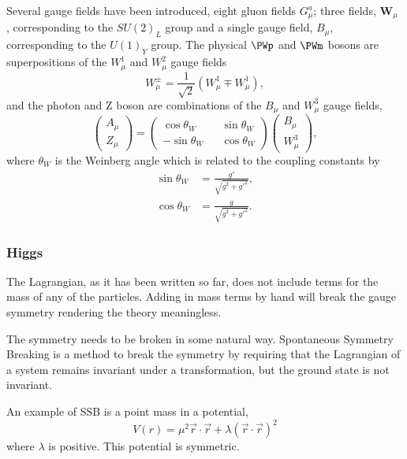 Several gauge fields have been introduced, eight gluon fields $G^{a}_{\mu}$;
three fields, $\mathbf{W}_{\mu}$ , corresponding to the $SU(2)_{L}$
group and a single gauge field, $B_{\mu}$, corresponding to the $U(1)_{Y}$ group.
The physical $\PWp$ and $\PWm$ bosons are superpositions of the $W^{1}_{\mu}$
and $W^{2}_{\mu}$ gauge fields
\begin{equation}
W^{\pm}_{\mu} = \frac{1}{\sqrt{2}} \left(W^{1}_{\mu} \mp W^{1}_{\mu}\right),
\label{eq:wgauge}
\end{equation}
and the photon and Z boson are combinations of the $B_{\mu}$ and $W^{3}_{\mu}$
gauge fields,
\begin{equation}
\left( \begin{matrix} A_{\mu}\\ Z_{\mu}\end{matrix}\right) =
\left( \begin{matrix} \cos\theta_{W} && \sin\theta_{W} \\  
                      -\sin\theta_{W} && \cos\theta_{W} \end{matrix}\right) 
\left( \begin{matrix} B_{\mu}\\ W^{3}_{\mu}\end{matrix}\right) ,
\label{eq:bgauge}
\end{equation}
where $\theta_{W}$ is the Weinberg angle which is related to the coupling
constants by
\begin{align*}
\sin\theta_{W} &= \frac{g\prime}{\sqrt{g^{2}+g\prime^{2}}},\\
\cos\theta_{W} &= \frac{g}{\sqrt{g^{2}+g\prime^{2}}}.
\end{align*}

\subsubsection{Higgs}

The Lagrangian, as it has been written so far, does not include terms for the
mass of any of the particles.  Adding in mass terms by hand will break the gauge
symmetry rendering the theory meaningless.  

The symmetry needs to be broken in some natural way.  Spontaneous Symmetry
Breaking is a method to break the symmetry by requiring that the Lagrangian of a
system remains invariant under a transformation, but the ground state is not
invariant.

An example of {SSB} is a point mass in a potential,
\begin{equation}
V(r) = \mu^{2} \vec{r} \cdot \vec{r} + \lambda ( \vec{r} \cdot \vec{r} )^{2}
\end{equation}
where $\lambda$ is positive. This potential is symmetric. 

